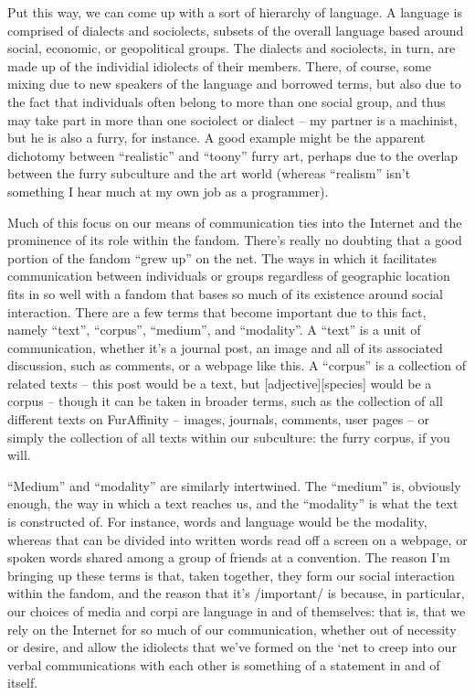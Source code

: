 Put this way, we can come up with a sort of hierarchy of language. A language is comprised of dialects and sociolects, subsets of the overall language based around social, economic, or geopolitical groups. The dialects and sociolects, in turn, are made up of the individial idiolects of their members. There, of course, some mixing due to new speakers of the language and borrowed terms, but also due to the fact that individuals often belong to more than one social group, and thus may take part in more than one sociolect or dialect -- my partner is a machinist, but he is also a furry, for instance. A good example might be the apparent dichotomy between ``realistic'' and ``toony'' furry art, perhaps due to the overlap between the furry subculture and the art world (whereas ``realism'' isn't something I hear much at my own job as a programmer).

Much of this focus on our means of communication ties into the Internet and the prominence of its role within the fandom. There's really no doubting that a good portion of the fandom ``grew up'' on the net. The ways in which it facilitates communication between individuals or groups regardless of geographic location fits in so well with a fandom that bases so much of its existence around social interaction. There are a few terms that become important due to this fact, namely ``text'', ``corpus'', ``medium'', and ``modality''. A ``text'' is a unit of communication, whether it's a journal post, an image and all of its associated discussion, such as comments, or a webpage like this. A ``corpus'' is a collection of related texts -- this post would be a text, but [adjective][species] would be a corpus -- though it can be taken in broader terms, such as the collection of all different texts on FurAffinity -- images, journals, comments, user pages -- or simply the collection of all texts within our subculture: the furry corpus, if you will.

``Medium'' and ``modality'' are similarly intertwined. The ``medium'' is, obviously enough, the way in which a text reaches us, and the ``modality'' is what the text is constructed of. For instance, words and language would be the modality, whereas that can be divided into written words read off a screen on a webpage, or spoken words shared among a group of friends at a convention. The reason I'm bringing up these terms is that, taken together, they form our social interaction within the fandom, and the reason that it's /important/ is because, in particular, our choices of media and corpi are language in and of themselves: that is, that we rely on the Internet for so much of our communication, whether out of necessity or desire, and allow the idiolects that we've formed on the `net to creep into our verbal communications with each other is something of a statement in and of itself.

